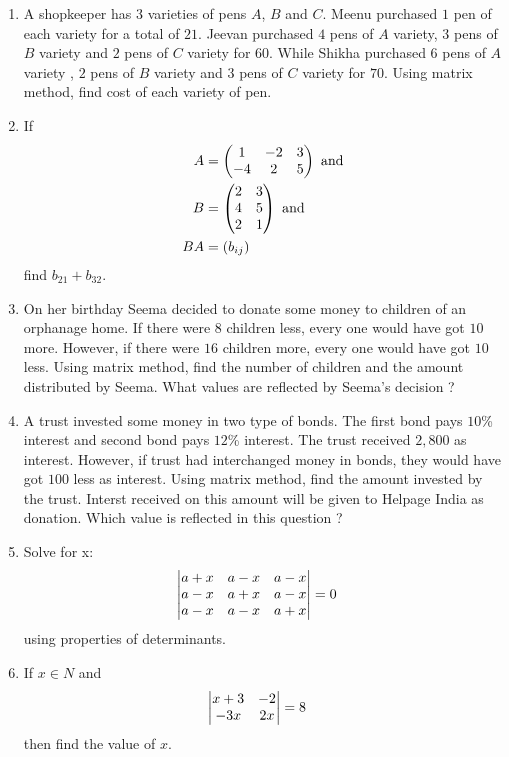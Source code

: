 \begin{enumerate}
    \item A shopkeeper has $3$ varieties of pens $A$, $B$ and $C$. Meenu purchased $1$ pen of each variety for a total of \rupee $21$. Jeevan purchased $4$ pens of $A$ variety, $3$ pens of $B$ variety and $2$ pens of $C$ variety for \rupee $60$. While Shikha purchased $6$ pens of $A$ variety , $2$ pens of $B$ variety and $3$ pens of $C$ variety for \rupee $70$. Using matrix method, find cost of each variety of pen.
    \item If
          \begin{align*}
              A  & =\begin{pmatrix}1      & -2 & 3 \\-4&2&5\end{pmatrix} \text{ and}\\
              B  & =\begin{pmatrix}2      & 3      \\4&5\\2&1\end{pmatrix} \text{ and}\\
              BA & =\left(b_{ij}\right)
          \end{align*}
          find $b_{21} + b_{32}$.
    \item On her birthday Seema decided to donate some money to children of an orphanage home. If there were $8$ children less, every one would have got \rupee $10$ more. However, if there were $16$ children more, every one would have got \rupee $10$ less. Using matrix method, find the number of children and the amount distributed by Seema. What values are reflected by Seema's decision ?
    \item A trust invested some money in two type of bonds. The first bond pays $10$\% interest and second bond pays $12$\% interest. The trust received \rupee $2,800$ as interest. However, if trust had interchanged money in bonds, they would have got \rupee $100$ less as interest. Using matrix method, find the amount invested by the trust. Interst received on this amount will be given to Helpage India as donation. Which value is reflected in this question ?
    \item Solve for x:
          \begin{align*}
              \begin{vmatrix}a+x & a-x & a-x \\a-x&a+x& a-x\\a-x & a-x & a+x\end{vmatrix} &=0
          \end{align*}
          using properties of determinants.
    \item If $x \in N$ and
          \begin{align*}
              \begin{vmatrix}x+3 & -2 \\ -3x & 2x\end{vmatrix} &= 8
          \end{align*}
          then find the value of $x$.


\end{enumerate}
